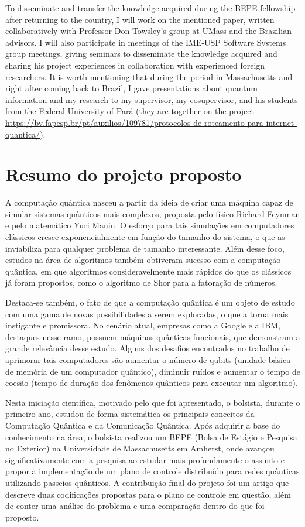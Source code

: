 \documentclass{article}
\begin{document}
    To disseminate and transfer the knowledge acquired during the BEPE fellowship after returning to the country, I will work on the mentioned paper, written collaboratively with Professor Don Towsley's group at UMass and the Brazilian advisors. I will also participate in meetings of the IME-USP Software Systems group meetings, giving seminars to disseminate the knowledge acquired and sharing his project experiences in collaboration with experienced foreign researchers. It is worth mentioning that during the period in Massachusetts and right after coming back to Brazil, I gave presentations about quantum information and my research to my supervisor, my cosupervisor, and his students from the Federal University of Pará (they are together on the project \href{https://bv.fapesp.br/pt/auxilios/109781/protocolos-de-roteamento-para-internet-quantica/}{https://bv.fapesp.br/pt/auxilios/109781/protocolos-de-roteamento-para-internet-quantica/}).


	\section{Resumo do projeto proposto}
    A computação quântica nasceu a partir da ideia de criar uma máquina capaz de simular sistemas quânticos mais complexos, proposta pelo físico Richard Feynman e pelo matemático Yuri Manin. O esforço para tais simulações em computadores clássicos cresce exponencialmente em função do tamanho do sistema, o que as inviabiliza para qualquer problema de tamanho interessante. Além desse foco, estudos na área de algoritmos também obtiveram sucesso com a computação quântica, em que algoritmos consideravelmente mais rápidos do que os clássicos já foram propostos, como o algoritmo de Shor para a fatoração de números.
    
	Destaca-se também, o fato de que a computação quântica é um objeto de estudo com uma gama de novas possibilidades a serem exploradas, o que a torna mais instigante e promissora. No cenário atual, empresas como a Google e a IBM, destaques nesse ramo, possuem máquinas quânticas funcionais, que demonstram a grande relevância desse estudo. Alguns dos desafios encontrados no trabalho de aprimorar tais computadores são aumentar o número de qubits (unidade básica de memória de um computador quântico), diminuir ruídos e aumentar o tempo de coesão (tempo de duração dos fenômenos quânticos para executar um algoritmo).
 
	Nesta iniciação científica, motivado pelo que foi apresentado, o bolsista, durante o primeiro ano, estudou de forma sistemática os principais conceitos da Computação Quântica e da Comunicação Quântica. Após adquirir a base do conhecimento na área, o bolsista realizou um BEPE (Bolsa de Estágio e Pesquisa no Exterior) na Universidade de Massachusetts em Amherst, onde avançou significativamente com a pesquisa ao estudar mais profundamente o assunto e propor a implementação de um plano de controle distribuído para redes quânticas utilizando passeios quânticos. A contribuição final do projeto foi um artigo que descreve duas codificações propostas para o plano de controle em questão, além de conter uma análise do problema e uma comparação dentro do que foi proposto. 
 
\end{document}
